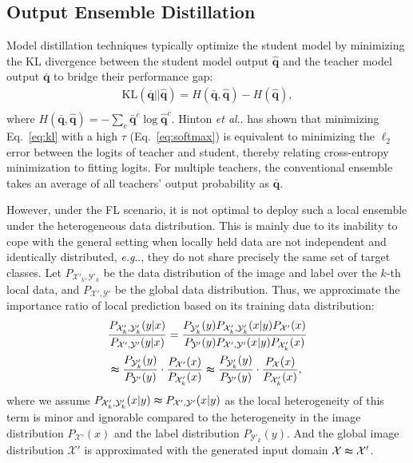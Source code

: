 \documentclass[letterpaper]{article} %
\makeatletter
\DeclareRobustCommand\onedot{\futurelet\@let@token\@onedot}
\def\@onedot{\ifx\@let@token.\else.\null\fi\xspace}
\def\eg{\emph{e.g}\onedot} \def\Eg{\emph{E.g}\onedot}
\def\etal{\emph{et al}\onedot}
\newcommand{\domx}{\mathcal{X}}
\newcommand{\domy}{\mathcal{Y}}
\makeatother
\begin{document}
\subsection{Output Ensemble Distillation}
Model distillation techniques typically optimize the student model by minimizing the KL divergence between the student model output $\hat{\bm{q}}$ and the teacher model output $\bar{\bm{q}}$ to bridge their performance gap:
\begin{equation}
\label{eq:kl}
\begin{aligned}
    \text{KL}(\bar{\bm{q}}|| \hat{\bm{q}}) = H(\bar{\bm{q}},\hat{\bm{q}}) - H(\hat{\bm{q}}),  \\
\end{aligned}
\end{equation}
where $H(\bar{\bm{q}}, \hat{\bm{q}})=-\sum_c \bar{\bm{q}}^c \log \hat{\bm{q}}^c$. Hinton \etal \cite{hinton2015distilling} has shown that minimizing Eq.~\ref{eq:kl} with a high $\tau$ (Eq.~\ref{eq:softmax}) is equivalent to minimizing the $\ell_2$ error between the logits of teacher and student, thereby relating cross-entropy minimization to fitting logits.  For multiple teachers, the conventional ensemble takes an average of all teachers' output probability as $\bar{\bm{q}}$.

However, under the FL scenario, it is not optimal to deploy such a local ensemble under the heterogeneous data distribution. This is mainly due to its inability to cope with the general setting when locally held data are not independent and identically distributed, \eg, they do not share precisely the same set of target classes. 
Let $P_{\domx'_k, \domy'_k}$ be the data distribution of the image and label over the $k$-th local data, and $P_{\domx', \domy'}$ be the global data distribution. Thus, we approximate the importance ratio of local prediction based on its training data distribution:
\begin{equation}
\label{eq:bias}
\begin{aligned}
    & \frac{P_{\domx'_k, \domy'_k}(y|x)}{P_{\domx', \domy'}(y|x)} = \frac{P_{\domy'_k}(y) P_{\domx'_k, \domy'_k}(x|y) P_{\domx'}(x)}{P_{\domy'}(y) P_{\domx', \domy'}(x|y) P_{\domx'_k}(x)} \\
    & \thickapprox  \frac{P_{\domy'_k}(y)}{P_{\domy'}(y)} \cdot \frac{P_{\domx'}(x)}{P_{\domx'_k}(x)} \thickapprox  \frac{P_{\domy'_k}(y)}{P_{\domy'}(y)} \cdot \frac{P_{\domx}(x)}{P_{\domx'_k}(x)} ,
\end{aligned}
\end{equation}
where we assume $P_{\domx'_k, \domy'_k}(x|y) \thickapprox  P_{\domx', \domy'}(x|y)$ as the local heterogeneity of this term is minor and ignorable compared to the heterogeneity in the image distribution $P_{\domx'}(x)$ and the label distribution $P_{\domy'_k}(y)$. And the global image distribution $\domx'$ is approximated with the generated input domain $\domx \thickapprox \domx'$. 
\end{document}
